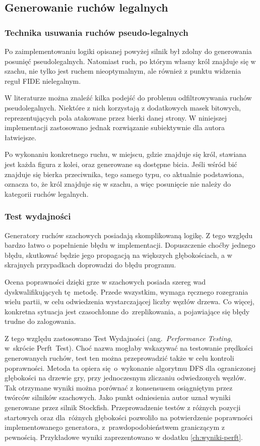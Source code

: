 \subsection{Generowanie ruchów legalnych}
\label{subsec:generowanie-ruchow-legalnych}

\subsubsection{Technika usuwania ruchów pseudo-legalnych}

Po zaimplementowaniu logiki opisanej powyżej silnik był zdolny do generowania posunięć pseudolegalnych.
Natomiast ruch, po którym własny król znajduje się w szachu, nie tylko jest ruchem nieoptymalnym, ale również z punktu widzenia reguł FIDE nielegalnym.

W literaturze można znaleźć kilka podejść do problemu odfiltrowywania ruchów pseudolegalnych.
Niektóre z nich korzystają z dodatkowych masek bitowych, reprezentujących pola atakowane przez bierki danej strony.
W niniejszej implementacji zastosowano jednak rozwiązanie subiektywnie dla autora łatwiejsze.

Po wykonaniu konkretnego ruchu, w miejscu, gdzie znajduje się król, stawiana jest każda figura z kolei, oraz generowane są dostępne bicia.
Jeśli wśród bić znajduje się bierka przeciwnika, tego samego typu, co aktualnie podstawiona, oznacza to, że król znajduje się w szachu, a więc posunięcie nie należy do kategorii ruchów legalnych.

\subsubsection{Test wydajności}

Generatory ruchów szachowych posiadają skomplikowaną logikę.
Z tego względu bardzo łatwo o popełnienie błędu w implementacji.
Dopuszczenie choćby jednego błędu, skutkować będzie jego propagacją na większych głębokościach, a w skrajnych przypadkach doprowadzi do błędu programu.

Ocena poprawności dzięki grze w szachowych posiada szereg wad dyskwalifikujących tę~metodę.
Przede wszystkim, wymaga ręcznego rozegrania wielu partii, w celu odwiedzenia wystarczającej liczby węzłów drzewa.
Co więcej, konkretna sytuacja jest czasochłonne do~zreplikowania, a pojawiające się błędy trudne do zalogowania.

Z tego względu zastosowano Test Wydajności (ang.~\emph{Performance Testing}, w~skrócie Perft~Test).
Choć nazwa mogłaby wskazywać na testowanie prędkości generowanych ruchów, test ten można przeprowadzić także w celu kontroli poprawności.
Metoda ta opiera się~o~wykonanie algorytmu DFS dla ograniczonej głębokości na drzewie gry, przy jednoczesnym zliczaniu odwiedzonych węzłów.
Tak otrzymane wyniki można porównać z konsensusem osiągniętym przez twórców silników szachowych.
Jako punkt odniesienia autor uznał wyniki generowane przez silnik Stockfish.
Przeprowadzenie testów z różnych pozycji startowych oraz dla~różnych głębokości pozwoliło na potwierdzenie poprawności implementowanego generatora, z~prawdopodobieństwem graniczącym z pewnością.
Przykładowe wyniki zaprezentowano w dodatku \ref{ch:wyniki-perft}.

